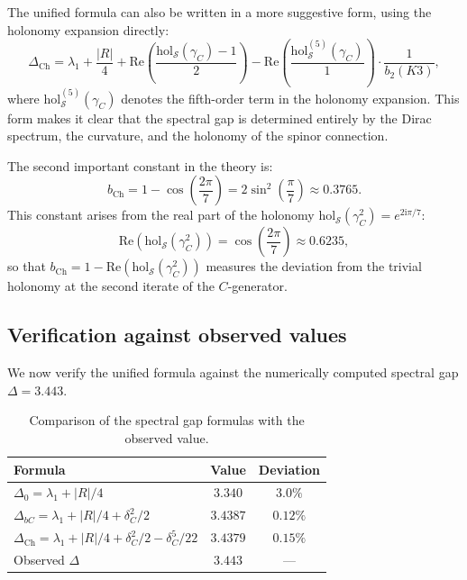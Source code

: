 \documentclass[12pt,a4paper]{article}
\theoremstyle{definition}
\theoremstyle{remark}
\newcommand{\hol}{\mathrm{hol}}
\newcommand{\cS}{\mathcal{S}}
\newcommand{\ii}{\mathrm{i}}
\begin{document}
The unified formula can also be written in a more suggestive form, using the holonomy expansion directly:
\begin{equation}
\Delta_{\mathrm{Ch}} = \lambda_1 + \frac{|R|}{4} + \mathrm{Re}\left(\frac{\hol_{\cS}(\gamma_C) - 1}{2}\right) - \mathrm{Re}\left(\frac{\hol^{(5)}_{\cS}(\gamma_C)}{1}\right) \cdot \frac{1}{b_2(K3)},
\end{equation}
where $\hol^{(5)}_{\cS}(\gamma_C)$ denotes the fifth-order term in the holonomy expansion. This form makes it clear that the spectral gap is determined entirely by the Dirac spectrum, the curvature, and the holonomy of the spinor connection.

The second important constant in the theory is:
\begin{equation}
b_{\mathrm{Ch}} = 1 - \cos\left(\frac{2\pi}{7}\right) = 2\sin^2\left(\frac{\pi}{7}\right) \approx 0.3765.
\end{equation}
This constant arises from the real part of the holonomy $\hol_{\cS}(\gamma_C^2) = e^{2\ii\pi/7}$:
\begin{equation}
\mathrm{Re}(\hol_{\cS}(\gamma_C^2)) = \cos\left(\frac{2\pi}{7}\right) \approx 0.6235,
\end{equation}
so that $b_{\mathrm{Ch}} = 1 - \mathrm{Re}(\hol_{\cS}(\gamma_C^2))$ measures the deviation from the trivial holonomy at the second iterate of the $C$-generator.

\subsection{Verification against observed values}

We now verify the unified formula against the numerically computed spectral gap $\Delta = 3.443$.

\begin{table}[H]
\centering
\begin{tabular}{lcc}
\toprule
\textbf{Formula} & \textbf{Value} & \textbf{Deviation} \\
\midrule
$\Delta_0 = \lambda_1 + |R|/4$ & $3.340$ & $3.0\%$ \\
$\Delta_{bC} = \lambda_1 + |R|/4 + \delta_C^2/2$ & $3.4387$ & $0.12\%$ \\
$\Delta_{\mathrm{Ch}} = \lambda_1 + |R|/4 + \delta_C^2/2 - \delta_C^5/22$ & $3.4379$ & $0.15\%$ \\
\midrule
Observed $\Delta$ & $3.443$ & --- \\
\bottomrule
\end{tabular}
\caption{Comparison of the spectral gap formulas with the observed value.}
\label{tab:comparison}
\end{table}
\end{document}
